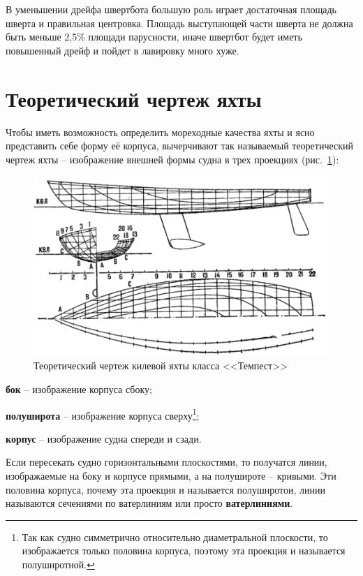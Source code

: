 \documentclass[a4paper, 12pt, twoside, final]{scrbook}
\begin{document}
В уменьшении дрейфа швертбота большую роль играет достаточная площадь шверта и правильная центровка. Площадь выступающей части шверта не должна быть меньше 2,5\% площади парусности, иначе швертбот будет иметь повышенный дрейф и пойдет в лавировку много хуже.

\section{Теоретический чертеж яхты}

Чтобы иметь возможность определить мореходные качества яхты и ясно представить себе форму её корпуса, вычерчивают так называемый теоретический чертеж яхты \--- изображение внешней формы судна в трех проекциях (рис.~\ref{fig:85}):

\begin{figure}[htbp]
   \centering
   \includegraphics{85_Teor_chertezh_Tempest} %
   \caption{Теоретический чертеж килевой яхты класса <<Темпест>>}
   \label{fig:85}
\end{figure}

\textbf{бок} \--- изображение корпуса сбоку;

\textbf{полуширота} \--- изображение корпуса сверху\footnote{Так как судно симметрично относительно диаметральной плоскости, то изображается только половина корпуса, поэтому эта проекция и называется полуширотной.};

\textbf{корпус} \--- изображение судна спереди и сзади.

Если пересекать судно горизонтальными плоскостями, то получатся линии, изображаемые на боку и корпусе прямыми, а на полушироте \--- кривыми. Эти половина корпуса, почему эта проекция и называется полушнротои, линии называются сечениями по ватерлиниям или просто \textbf{ватерлиниями}.
\end{document}

